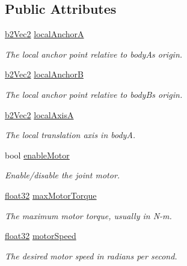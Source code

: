 \subsection*{Public Attributes}
\begin{DoxyCompactItemize}
\item 
\mbox{\hyperlink{structb2_vec2}{b2\+Vec2}} \mbox{\hyperlink{structb2_wheel_joint_def_a9429d2273bfdd8bdc0db416e73b89ae4}{local\+AnchorA}}
\begin{DoxyCompactList}\small\item\em The local anchor point relative to bodyA\textquotesingle{}s origin. \end{DoxyCompactList}\item 
\mbox{\hyperlink{structb2_vec2}{b2\+Vec2}} \mbox{\hyperlink{structb2_wheel_joint_def_a88ba0f7108076b9d7ced68425be95c27}{local\+AnchorB}}
\begin{DoxyCompactList}\small\item\em The local anchor point relative to bodyB\textquotesingle{}s origin. \end{DoxyCompactList}\item 
\mbox{\hyperlink{structb2_vec2}{b2\+Vec2}} \mbox{\hyperlink{structb2_wheel_joint_def_ad635ee7b77b50037dc0e021a0f5c93a6}{local\+AxisA}}
\begin{DoxyCompactList}\small\item\em The local translation axis in bodyA. \end{DoxyCompactList}\item 
bool \mbox{\hyperlink{structb2_wheel_joint_def_a8e7193d6c34c784ffd71e79d3a70acc6}{enable\+Motor}}
\begin{DoxyCompactList}\small\item\em Enable/disable the joint motor. \end{DoxyCompactList}\item 
\mbox{\hyperlink{b2_settings_8h_aacdc525d6f7bddb3ae95d5c311bd06a1}{float32}} \mbox{\hyperlink{structb2_wheel_joint_def_ab658ce0fae40c6de09133659f7ffb829}{max\+Motor\+Torque}}
\begin{DoxyCompactList}\small\item\em The maximum motor torque, usually in N-\/m. \end{DoxyCompactList}\item 
\mbox{\hyperlink{b2_settings_8h_aacdc525d6f7bddb3ae95d5c311bd06a1}{float32}} \mbox{\hyperlink{structb2_wheel_joint_def_a7248e25f2ca6b6c2a5f7079ce16e7748}{motor\+Speed}}
\begin{DoxyCompactList}\small\item\em The desired motor speed in radians per second. \end{DoxyCompactList}\item 

\end{DoxyCompactItemize}

